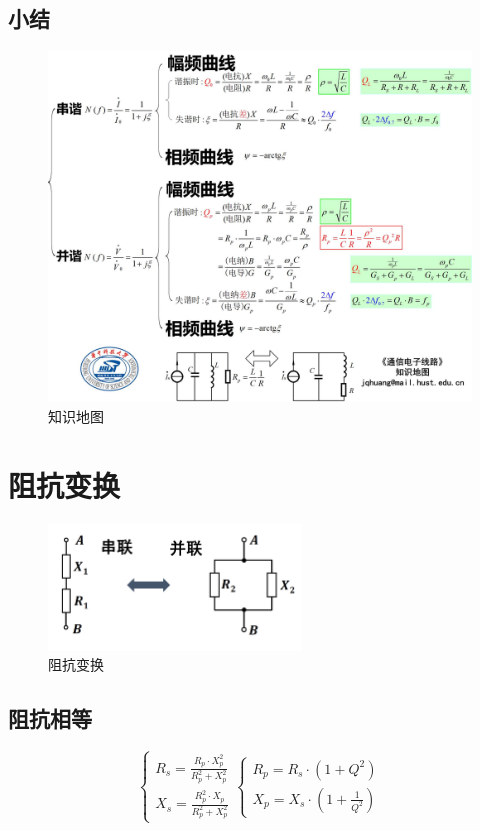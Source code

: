 \documentclass[a4paper]{report}
\begin{document}
\subsection{小结}
\begin{figure}[H]
\centering
\includegraphics[width=1\textwidth]{res_map.jpg}
\caption{知识地图}
\end{figure}
\section{阻抗变换}
\begin{figure}[H]
\centering
\includegraphics[width=0.6\textwidth]{s_r_conversion.png}
\caption{阻抗变换}
\end{figure}
\subsection{阻抗相等}
$$
  \begin{cases}
    R_s=\frac{R_p\cdot X_p^2}{R_p^2+X_p^2}\\
    X_s=\frac{R_p^2\cdot X_p}{R_p^2+X_p^2}
  \end{cases}
  \begin{cases}
    R_p=R_s\cdot(1+Q^2)\\
    X_p=X_s\cdot(1+\frac{1}{Q^2})
  \end{cases}
$$
\end{document}

